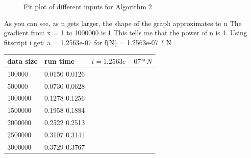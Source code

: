 \documentclass{article}
\begin{document}
\begin{figure}
   \centering
  
   \caption{Fit plot of different inputs for Algorithm 2}
   \label{fig:experiment4}
\end{figure}

As you can see, as n gets larger, the shape of the graph approximates to n
The gradient from x = 1 to 1000000 is 1
This tells me that the power of n is 1.
Using fitscript i get: a = 1.2563e-07 for f(N) = 1.2563e-07 * N 


 \begin{center}
 \begin{tabular}{l||l|l|}
   data size   & run time    & $t = 1.2563e-07*N$       \\  \hline
   100000      &0.0150           0.0126                \\
   500000			 &0.0730				   0.0628						     \\
   1000000		 &0.1278					 0.1256						     \\
   1500000		 &0.1958				   0.1884							   \\
   2000000	   &0.2522					 0.2513							   \\
   2500000		 &0.3107					 0.3141						     \\
   3000000     &0.3729           0.3767                \\

\end{tabular}
 \end{center}
\end{document}
